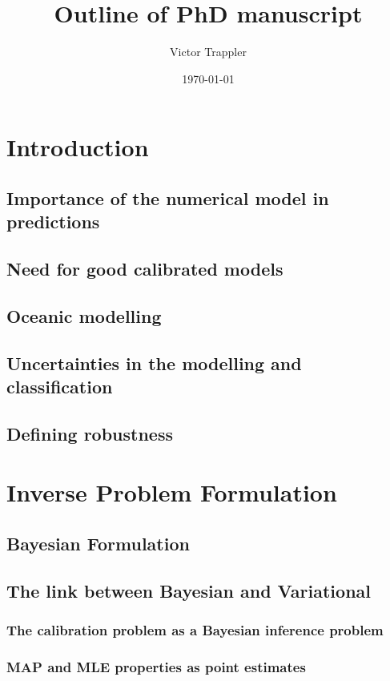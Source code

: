 \documentclass[11pt]{article}
\author{Victor Trappler}
\date{\today}
\title{Outline of PhD manuscript}
\begin{document}
\maketitle
\tableofcontents



\section{Introduction}
\label{sec:orge18212c}
\subsection{Importance of the numerical model in predictions}
\label{sec:org4d2a4b2}
\subsection{Need for good calibrated models}
\label{sec:orga07d2b1}
\subsection{Oceanic modelling}
\label{sec:org10b3a75}
\subsection{Uncertainties in the modelling and classification}
\label{sec:org7b5a89b}
\subsection{Defining robustness}
\label{sec:org17b820d}

\section{Inverse Problem Formulation}
\label{sec:orgfbfa119}
\subsection{Bayesian Formulation}
\label{sec:orgb2da19a}
\subsection{The link between Bayesian and Variational}
\label{sec:orgc668001}
\subsubsection{The calibration problem as a Bayesian inference problem}
\label{sec:orgf26cfe5}
\subsubsection{MAP and MLE properties as point estimates}
\label{sec:org3de970f}
\end{document}

